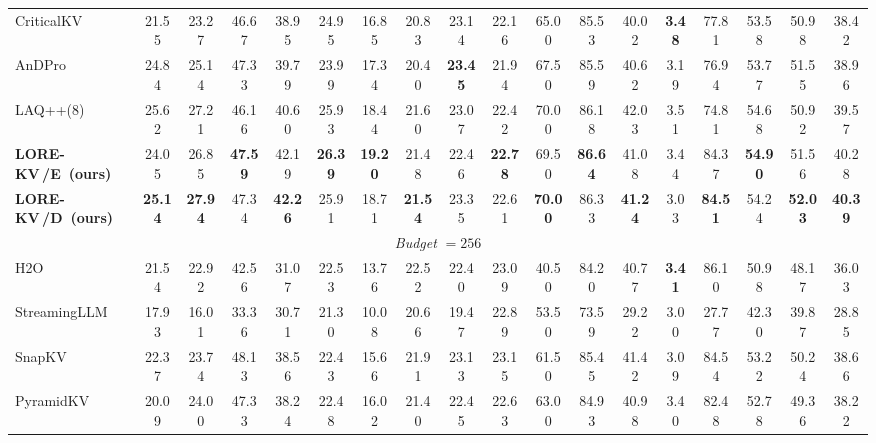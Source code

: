 \documentclass{article} %
\newcommand{\best}[1]{\textcolor{bestblue}{\textbf{#1}}}
\newcommand{\second}[1]{\textcolor{secondorange}{#1}}
\newcommand{\lorekvE}{LORE-KV\,/E}
\newcommand{\lorekvD}{LORE-KV\,/D}
\begin{document}
\begin{table}[t]
{\begin{tabular}{lccccccccccccccccc}
CriticalKV 
& 21.55 & 23.27 & 46.67 
& 38.95 & 24.95 & 16.85 
& 20.83 & 23.14 & 22.16 
& 65.00 & 85.53 & 40.02 
& \best{3.48} & 77.81 
& 53.58 & 50.98 
& 38.42 \\

AnDPro 
& \second{24.84} & 25.14 & 47.33 
& 39.79 & 23.99 & 17.34 
& 20.40 & \best{23.45} & 21.94 
& 67.50 & 85.59 & 40.62 
& 3.19 & 76.94 
& 53.77 & 51.55 
& 38.96 \\

LAQ++(8) 
& 25.62 & 27.21 & 46.16 
& 40.60 & 25.93 & 18.44 
& 21.60 & 23.07 & 22.42 
& 70.00 & 86.18 & 42.03 
& 3.51 & 74.81 
& 54.68 & 50.92 
& 39.57 \\

\textbf{\lorekvE\ (ours)} 
& 24.05 & \second{26.85} & \best{47.59} 
& \second{42.19} & \best{26.39} & \best{19.20} 
& \second{21.48} & 22.46 & \best{22.78} 
& \second{69.50} & \best{86.64} & \second{41.08} 
& \second{3.44} & \second{84.37} 
& \best{54.90} & \second{51.56} 
& \second{40.28} \\

\textbf{\lorekvD\ (ours)} 
& \best{25.14} & \best{27.94} & \second{47.34} 
& \best{42.26} & \second{25.91} & \second{18.71} 
& \best{21.54} & \second{23.35} & \second{22.61} 
& \best{70.00} & \second{86.33} & \best{41.24} 
& 3.03 & \best{84.51} 
& \second{54.24} & \best{52.03} 
& \best{40.39} \\

\midrule
\multicolumn{18}{c}{\textit{Budget} $=256$} \\
\midrule

H2O 
& 21.54 & 22.92 & 42.56 
& 31.07 & 22.53 & 13.76 
& 22.52 & 22.40 & 23.09 
& 40.50 & 84.20 & 40.77 
& \best{3.41} & 86.10 
& 50.98 & 48.17 
& 36.03 \\

StreamingLLM 
& 17.93 & 16.01 & 33.36 
& 30.71 & 21.30 & 10.08 
& 20.66 & 19.47 & 22.89 
& 53.50 & 73.59 & 29.22 
& 3.00 & 27.77 
& 42.30 & 39.87 
& 28.85 \\

SnapKV 
& 22.37 & 23.74 & 48.13 
& 38.56 & 22.43 & 15.66 
& 21.91 & 23.13 & 23.15 
& 61.50 & 85.45 & 41.42 
& 3.09 & 84.54 
& 53.22 & 50.24 
& 38.66 \\

PyramidKV 
& 20.09 & 24.00 & 47.33 
& 38.24 & 22.48 & 16.02 
& 21.40 & 22.45 & 22.63 
& 63.00 & 84.93 & 40.98 
& \second{3.40} & 82.48 
& 52.78 & 49.36 
& 38.22 \\


\end{tabular}}
\end{table}
\end{document}
